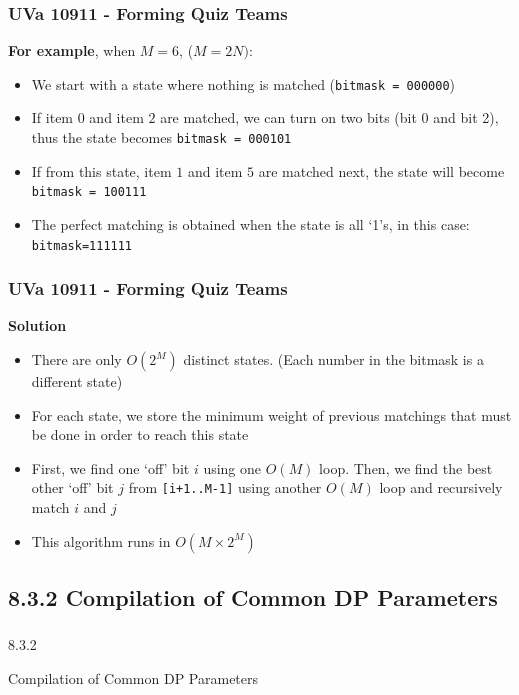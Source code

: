 \documentclass{beamer}
\begin{document}
\begin{frame}[fragile]
\frametitle{UVa 10911 - Forming Quiz Teams}

\textbf{For example}, when $M=6$, ($M=2N)$:

\begin{itemize}
    \item We start with a state where nothing is matched (\verb|bitmask = 000000|)
    
    \pause 
    \item If item $0$ and item $2$ are matched, we can turn on two bits (bit 0 and bit 2), thus the state becomes \verb|bitmask = 000101|
    
    \pause 
   	\item If from this state, item $1$ and item $5$ are matched next, the state will become \verb|bitmask = 100111|
	
	\pause 
	\item The perfect matching is obtained when the state is all ‘1’s, in this case: \verb|bitmask=111111|
\end{itemize}

\end{frame}

\begin{frame}[fragile]
\frametitle{UVa 10911 - Forming Quiz Teams}

\textbf{Solution}

\begin{itemize}
    \item There are only $O(2^M)$ distinct states. (Each number in the bitmask is a different state)
    \pause 
    \item For each state, we store the minimum weight of previous matchings that must be done in order to reach this state
    \pause 
    \item First, we find one ‘off’ bit $i$ using one $O(M)$ loop. Then, we find the best other ‘off’ bit $j$ from \verb|[i+1..M-1]| using another $O(M)$ loop and recursively match $i$ and $j$
    \pause
    \item This algorithm runs in $O(M\times 2^M)$
\end{itemize}

\end{frame}

\subsection{8.3.2 Compilation of Common DP Parameters}
\begin{frame}
\frametitle{}
\color{blue}
\centerline{\Large{8.3.2}}
\vspace{0.3cm} 
\centerline{\Large{Compilation of Common DP Parameters}}
\color{black}
\end{frame}
\end{document}

